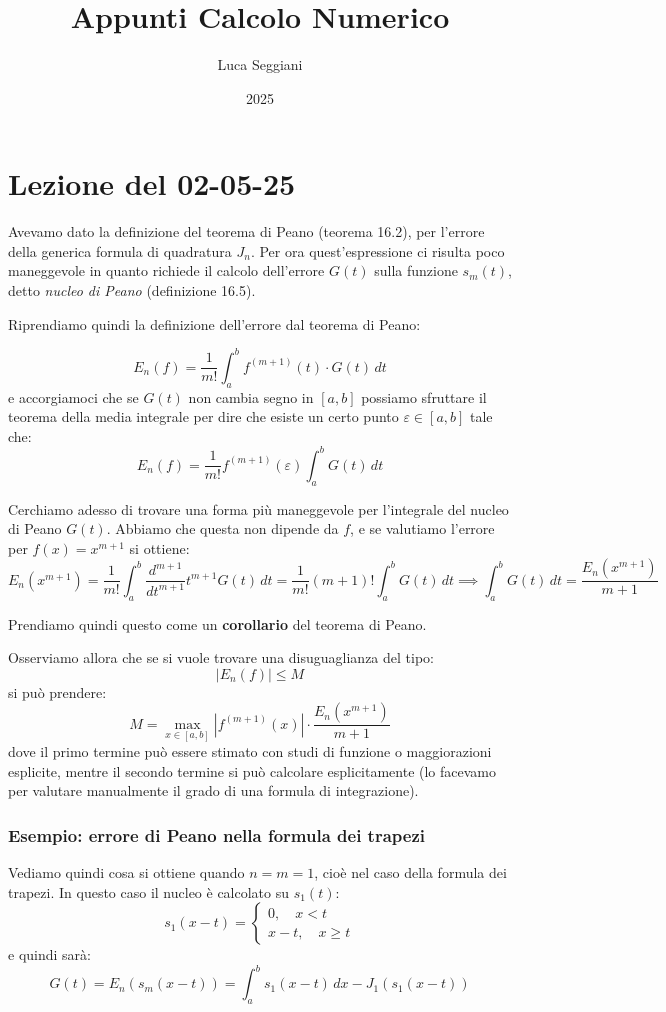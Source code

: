 \documentclass[a4paper,11pt]{article}
\title{Appunti Calcolo Numerico}
\author{Luca Seggiani}
\date{2025}
\begin{document}
\section{Lezione del 02-05-25}

\thispagestyle{empty}
\pagestyle{fancy}

Avevamo dato la definizione del teorema di Peano (teorema 16.2), per l'errore della generica formula di quadratura $J_n$.
Per ora quest'espressione ci risulta poco maneggevole in quanto richiede il calcolo dell'errore $G(t)$ sulla funzione $s_m(t)$, detto \textit{nucleo di Peano} (definizione 16.5).

Riprendiamo quindi la definizione dell'errore dal teorema di Peano:

$$
E_n(f) = \frac{1}{m!} \int_a^b f^{(m + 1)}(t) \cdot G(t) \, dt
$$
e accorgiamoci che se $G(t)$ non cambia segno in $[a, b]$ possiamo sfruttare il teorema della media integrale per dire che esiste un certo punto $\varepsilon \in [a, b]$ tale che:
$$
E_n(f) = \frac{1}{m!} f^{(m + 1)}(\varepsilon) \int_a^b G(t) \, dt
$$

Cerchiamo adesso di trovare una forma più maneggevole per l'integrale del nucleo di Peano $G(t)$.
Abbiamo che questa non dipende da $f$, e se valutiamo l'errore per $f(x) = x^{m + 1}$ si ottiene:
$$
E_n(x^{m + 1}) = \frac{1}{m!} \int_a^b \frac{d^{m + 1}}{dt^{m + 1}} t^{m + 1} G(t) \, dt = \frac{1}{m!} (m + 1)! \int_a^b G(t) \, dt \implies \int_a^b G(t) \, dt = \frac{E_n(x^{m + 1})}{m + 1}
$$

Prendiamo quindi questo come un \textbf{corollario} del teorema di Peano.

Osserviamo allora che se si vuole trovare una disuguaglianza del tipo:
$$
|E_n(f)| \leq M
$$
si può prendere:
$$
M = \max_{x \in [a, b]} \left| f^{(m + 1)}(x) \right| \cdot \frac{E_n(x^{m + 1})}{m + 1}
$$
dove il primo termine può essere stimato con studi di funzione o maggiorazioni esplicite, mentre il secondo termine si può calcolare esplicitamente (lo facevamo per valutare manualmente il grado di una formula di integrazione).

\subsubsection{Esempio: errore di Peano nella formula dei trapezi}
Vediamo quindi cosa si ottiene quando $n = m = 1$, cioè nel caso della formula dei trapezi.
In questo caso il nucleo è calcolato su $s_1(t)$:
$$
s_1(x - t) =
\begin{cases}
	0, \quad x < t \\
	x - t, \quad x \geq t
\end{cases}
$$
e quindi sarà:
$$
G(t) = E_n(s_m(x - t)) = \int_a^b s_1(x - t) \, dx - J_1 (s_1 (x - t))
$$
\end{document}
